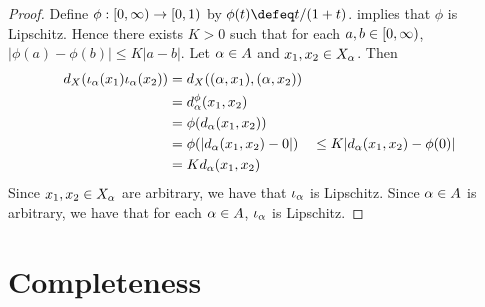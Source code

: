 \documentclass{book}
\begin{document}
\begin{proof}
	Define $\phi:[0,\infty) \rightarrow [0,1)$ by $\phi(t) \defeq t/(1 + t)$.  implies that $\phi$ is Lipschitz. Hence there exists $K > 0$ such that for each $a, b \in [0,\infty)$, $|\phi(a) - \phi(b)| \leq K |a - b|$. Let $\alpha \in A$ and $x_1, x_2 \in X_{\alpha}$. Then 
	\begin{align*}
		d_X(\iota_{\alpha}(x_1) \iota_{\alpha}(x_2))
		& = d_X((\alpha, x_1), (\alpha, x_2)) \\
		& = d_{\alpha}^{\phi}(x_1, x_2) \\
		& = \phi(d_{\alpha}(x_1, x_2)) \\
		& = \phi(|d_{\alpha}(x_1, x_2) - 0|)
		& \leq K|d_{\alpha}(x_1, x_2) - \phi(0)| \\
		& = K d_{\alpha}(x_1, x_2) 
	\end{align*}
	Since $x_1, x_2 \in X_{\alpha}$ are arbitrary, we have that $\iota_{\alpha}$ is Lipschitz. Since $\alpha \in A$ is arbitrary, we have that for each $\alpha \in A$, $\iota_{\alpha}$ is Lipschitz.
\end{proof}



































































\newpage
\section{Completeness}
\end{document}
